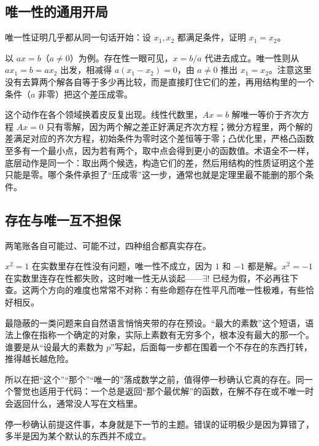 \subsection{唯一性的通用开局}

唯一性证明几乎都从同一句话开始：设 \(x_1,x_2\) 都满足条件，证明 \(x_1=x_2\)。

以 \(ax=b\)（\(a\ne0\)）为例。存在性一眼可见，\(x=b/a\) 代进去成立。唯一性则从 \(ax_1=b=ax_2\) 出发，相减得 \(a(x_1-x_2)=0\)，由 \(a\ne0\) 推出 \(x_1=x_2\)。注意这里没有去算两个解各自等于多少再比较，而是直接盯住它们的差，再用结构里的一个条件（\(a\) 非零）把这个差压成零。

这个动作在各个领域换着皮反复出现。线性代数里，\(Ax=b\) 解唯一等价于齐次方程 \(Ax=0\) 只有零解，因为两个解之差正好满足齐次方程；微分方程里，两个解的差满足对应的齐次方程，初始条件为零时这个差恒等于零；凸优化里，严格凸函数至多有一个最小点，因为若有两个，取中点会得到更小的函数值。术语全不一样，底层动作是同一个：取出两个候选，构造它们的差，然后用结构的性质证明这个差只能是零。哪个条件承担了``压成零''这一步，通常也就是定理里最不能删的那个条件。

\subsection{存在与唯一互不担保}

两笔账各自可能过、可能不过，四种组合都真实存在。

\(x^2=1\) 在实数里存在性没有问题，唯一性不成立，因为 \(1\) 和 \(-1\) 都是解。\(x^2=-1\) 在实数里连存在性都失败，这时唯一性无从谈起——\(\exists!\) 已经为假，不必再往下查。这两个方向的难度也常常不对称：有些命题存在性平凡而唯一性极难，有些恰好相反。

最隐蔽的一类问题来自自然语言悄悄夹带的存在预设。``最大的素数''这个短语，语法上像在指称一个确定的对象，实际上素数有无穷多个，根本没有最大的那一个。谁要是从``设最大的素数为 \(p\)''写起，后面每一步都在围着一个不存在的东西打转，推得越长越危险。

所以在把``这个''``那个''``唯一的''落成数学之前，值得停一秒确认它真的存在。同一个警觉也适用于代码：一个总是返回``那个最优解''的函数，在解不存在或不唯一时会返回什么，通常没人写在文档里。

停一秒确认前提这件事，本身就是下一节的主题。错误的证明极少是因为算错了，多半是因为某个默认的东西并不成立。
